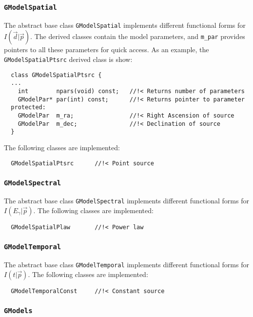 \documentclass{article}[12pt,a4]
\begin{document}
\subsubsection{{\tt GModelSpatial}}

The abstract base class {\tt GModelSpatial} implements different functional forms for 
$I(\vec{d} | \vec{p})$.
The derived classes contain the model parameters, and {\tt m\_par} provides pointers
to all these parameters for quick access.
As an example, the {\tt GModelSpatialPtsrc} derived class is show:
\begin{verbatim}
  class GModelSpatialPtsrc {
  ...
    int        npars(void) const;   //!< Returns number of parameters
    GModelPar* par(int) const;      //!< Returns pointer to parameter
  protected:
    GModelPar  m_ra;                //!< Right Ascension of source
    GModelPar  m_dec;               //!< Declination of source
  }
\end{verbatim}
The following classes are implemented:
\begin{verbatim}
  GModelSpatialPtsrc      //!< Point source
\end{verbatim}


\subsubsection{{\tt GModelSpectral}}

The abstract base class {\tt GModelSpectral} implements different functional forms for 
$I(E_{\gamma} | \vec{p})$.
The following classes are implemented:
\begin{verbatim}
  GModelSpatialPlaw       //!< Power law
\end{verbatim}


\subsubsection{{\tt GModelTemporal}}

The abstract base class {\tt GModelTemporal} implements different functional forms for 
$I(t | \vec{p})$.
The following classes are implemented:
\begin{verbatim}
  GModelTemporalConst     //!< Constant source
\end{verbatim}


\subsubsection{{\tt GModels}}
\end{document}
